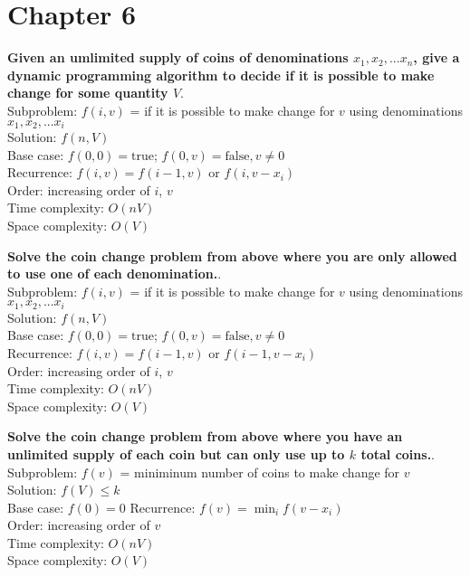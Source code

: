 \section{Chapter 6}

\begin{problem}{6.17}
    \textbf{Given an umlimited supply of coins of denominations $x_1, x_2, ... x_n$, give a dynamic programming algorithm to decide if it is possible to make change for some quantity $V$}. \\
    Subproblem: $f(i, v)$ = if it is possible to make change for $v$ using denominations $x_1, x_2, ... x_i$ \\
    Solution: $f(n, V)$ \\
    Base case: $f(0, 0) = \text{true}$; $f(0, v) = \text{false}, v \neq 0$ \\
    Recurrence: $f(i, v) = f(i - 1, v)$ or $f(i, v - x_i) $ \\
    Order: increasing order of $i$, $v$ \\
    Time complexity: $O(nV)$ \\
    Space complexity: $O(V)$
\end{problem}

\begin{problem}{6.18}
    \textbf{Solve the coin change problem from above where you are only allowed to use one of each denomination.}. \\
    Subproblem: $f(i, v)$ = if it is possible to make change for $v$ using denominations $x_1, x_2, ... x_i$ \\
    Solution: $f(n, V)$ \\
    Base case: $f(0, 0) = \text{true}$; $f(0, v) = \text{false}, v \neq 0$ \\
    Recurrence: $f(i, v) = f(i - 1, v)$ or $f(i - 1, v - x_i) $ \\
    Order: increasing order of $i$, $v$ \\
    Time complexity: $O(nV)$ \\
    Space complexity: $O(V)$
\end{problem}

\begin{problem}{6.19}
    \textbf{Solve the coin change problem from above where you have an unlimited supply of each coin but can only use up to $k$ total coins.}. \\
    Subproblem: $f(v)$ = miniminum number of coins to make change for $v$ \\
    Solution: $f(V) \leq k$ \\
    Base case: $f(0) = 0$
    Recurrence: $f(v) = \min_{i}f(v - x_i)$ \\
    Order: increasing order of $v$ \\
    Time complexity: $O(nV)$ \\
    Space complexity: $O(V)$
\end{problem}

